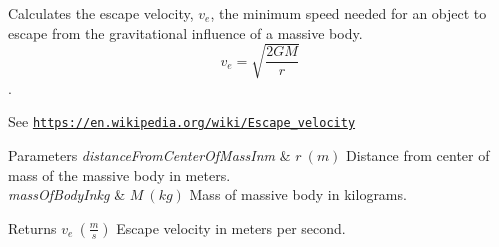 Calculates the escape velocity, $v_{e}$, the minimum speed needed for an object to escape from the gravitational influence of a massive body. \[v_{e}=\sqrt{\frac{2 G M}{r}}\]. 

See \href{https://en.wikipedia.org/wiki/Escape_velocity}{\tt https\+://en.\+wikipedia.\+org/wiki/\+Escape\+\_\+velocity}


\begin{DoxyParams}{Parameters}
{\em distance\+From\+Center\+Of\+Mass\+Inm} & $r\ (m)$ Distance from center of mass of the massive body in meters. \\
\hline
{\em mass\+Of\+Body\+Inkg} & $M\ (kg)$ Mass of massive body in kilograms. \\
\hline
\end{DoxyParams}
\begin{DoxyReturn}{Returns}
$v_{e}\ (\frac{m}{s})$ Escape velocity in meters per second. 
\end{DoxyReturn}
